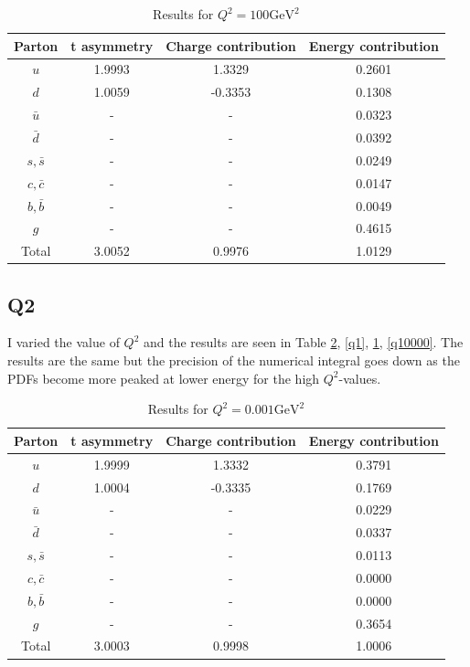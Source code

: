 \documentclass[a4paper,10pt]{article}
\begin{document}
\begin{table}[ht]
\caption{Results for $Q^2=100 \mathrm{GeV}^2$}
\label{q100}
\centering %
\begin{tabular}{cccc} %
\hline
Parton & t asymmetry & Charge contribution & Energy contribution\\
\hline
$u$ & 1.9993 & 1.3329 & 0.2601 \\
$d$ & 1.0059 & -0.3353 & 0.1308 \\
$\bar{u}$ & - & - & 0.0323\\
$\bar{d}$ & - & - & 0.0392\\
$s, \bar{s}$ & - & - & 0.0249\\
$c, \bar{c}$ & - & - & 0.0147\\
$b, \bar{b}$ & - & - & 0.0049\\
$g$ & - & - & 0.4615\\
Total & 3.0052 & 0.9976 & 1.0129
\end{tabular}
\end{table}
\subsection{Q2}
I varied the value of $Q^2$ and the results are seen in Table \ref{q0.001}, \ref{q1}, \ref{q100}, \ref{q10000}. The results are the same but the precision of the numerical integral goes down as the PDFs become more peaked at lower energy for the high $Q^2$-values.
 \begin{table}[ht]
\caption{Results for $Q^2=0.001 \mathrm{GeV}^2$}
\label{q0.001}
\centering %
\begin{tabular}{cccc} %
\hline
Parton & t asymmetry & Charge contribution & Energy contribution\\
\hline
$u$ & 1.9999 & 1.3332 & 0.3791 \\
$d$ & 1.0004 & -0.3335 & 0.1769 \\
$\bar{u}$ & - & - & 0.0229\\
$\bar{d}$ & - & - & 0.0337\\
$s, \bar{s}$ & - & - & 0.0113\\
$c, \bar{c}$ & - & - & 0.0000\\
$b, \bar{b}$ & - & - & 0.0000\\
$g$ & - & - & 0.3654\\
Total & 3.0003 & 0.9998 & 1.0006
\end{tabular}
\end{table}
\end{document}
